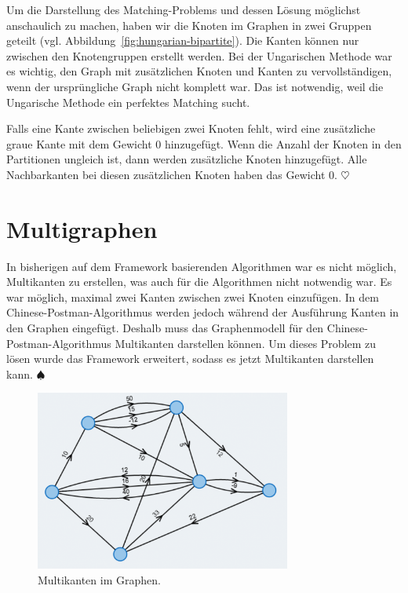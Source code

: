 Um die Darstellung des Matching-Problems und dessen Lösung möglichst anschaulich zu machen, haben wir die Knoten im Graphen in zwei Gruppen geteilt (vgl. Abbildung~\ref{fig:hungarian-bipartite}). Die Kanten können nur zwischen den Knotengruppen erstellt werden. Bei der Ungarischen Methode war es wichtig, den Graph mit zusätzlichen Knoten und Kanten zu vervollständigen, wenn der ursprüngliche Graph nicht komplett war. Das ist notwendig, weil die Ungarische Methode ein perfektes Matching sucht.

Falls eine Kante zwischen beliebigen zwei Knoten fehlt, wird eine zusätzliche graue Kante mit dem Gewicht 0 hinzugefügt. Wenn die Anzahl der Knoten in den Partitionen ungleich ist, dann werden zusätzliche Knoten hinzugefügt. Alle Nachbarkanten bei diesen zusätzlichen Knoten haben das Gewicht 0. \hfill$\heartsuit$

\section{Multigraphen} %
In bisherigen auf dem Framework basierenden Algorithmen war es nicht möglich, Multikanten zu erstellen, was auch für die Algorithmen nicht notwendig war. Es war möglich, maximal zwei Kanten zwischen zwei Knoten einzufügen. 
In dem Chinese-Postman-Algorithmus werden jedoch während der Ausführung Kanten in den Graphen eingefügt. Deshalb muss das Graphenmodell für den Chinese-Postman-Algorithmus Multikanten darstellen können. Um dieses Problem zu lösen wurde das Framework erweitert, sodass es jetzt Multikanten darstellen kann. \hfill$\spadesuit$
\begin{figure}[h!]
	\centering
	\includegraphics[width=0.75\textwidth]{figures/multigraph}
	\caption[Multigraph]{Multikanten im Graphen.}\label{fig:multigraph}
\end{figure}

